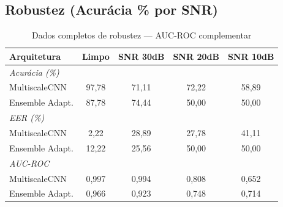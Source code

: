 \documentclass[12pt,a4paper]{article}
\begin{document}
\subsection{Robustez (Acur\'{a}cia \% por SNR)}

\begin{table}[H]
\centering
\caption{Dados completos de robustez --- AUC-ROC complementar}
\begin{tabular}{lcccc}
\toprule
\textbf{Arquitetura} & \textbf{Limpo} & \textbf{SNR 30dB} &
\textbf{SNR 20dB} & \textbf{SNR 10dB} \\
\midrule
\multicolumn{5}{l}{\textit{Acur\'{a}cia (\%)}} \\
MultiscaleCNN & 97,78 & 71,11 & 72,22 & 58,89 \\
Ensemble Adapt. & 87,78 & 74,44 & 50,00 & 50,00 \\
\midrule
\multicolumn{5}{l}{\textit{EER (\%)}} \\
MultiscaleCNN & 2,22 & 28,89 & 27,78 & 41,11 \\
Ensemble Adapt. & 12,22 & 25,56 & 50,00 & 50,00 \\
\midrule
\multicolumn{5}{l}{\textit{AUC-ROC}} \\
MultiscaleCNN & 0,997 & 0,994 & 0,808 & 0,652 \\
Ensemble Adapt. & 0,966 & 0,923 & 0,748 & 0,714 \\
\bottomrule
\end{tabular}
\end{table}
\end{document}

